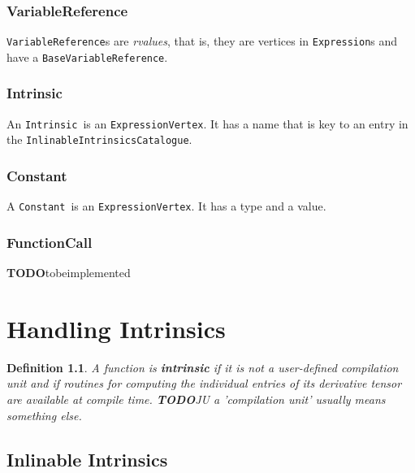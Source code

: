 \documentclass{book}
\newcommand{\todo}{{\bf TODO}}
\newcommand{\BaseVariableReference}{{\tt BaseVariableReference}}
\newcommand{\Constant}{{\tt Constant}}
\newcommand{\Expression}{{\tt Expression}}
\newcommand{\ExpressionVertex}{{\tt ExpressionVertex}}
\newcommand{\InlinableIntrinsicsCatalogue}{{\tt InlinableIntrinsicsCatalogue}}
\newcommand{\Intrinsic}{{\tt Intrinsic}}
\newcommand{\VariableReference}{{\tt VariableReference}}
\newtheorem{Def}{Definition}
\begin{document}
\subsection{VariableReference}
\label{ssec:VariableReference}

{\VariableReference}s are {\em rvalues}, that is, they are vertices in 
{\Expression}s and have a \BaseVariableReference. 

\subsection{Intrinsic}
\label{ssec:Intrinsic}
An \Intrinsic\ is an \ExpressionVertex. It has a name 
that is key to  
an entry in the \InlinableIntrinsicsCatalogue.

\subsection{Constant}
\label{ssec:Constant}
A \Constant\ is an  \ExpressionVertex. It has a type 
and a value.

\subsection{FunctionCall}
\label{ssec:FunctionCall}
\todo tobeimplemented

\chapter{Handling Intrinsics}
\label{ch:Intrinsics}

\begin{Def} \label{def:intrinsic}
A function is {\bf intrinsic} if it is not a user-defined
compilation unit and if routines for computing
the individual entries of its derivative tensor are available
at compile time.
\todo JU a 'compilation unit' usually means something else.
\end{Def}

\section{Inlinable Intrinsics}
\label{sec:InlinableIntrinsics}
\end{document}
